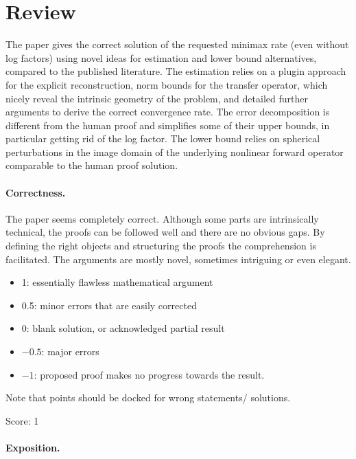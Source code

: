 \documentclass[11pt]{article}
\numberwithin{equation}{section}
\begin{document}
\maketitle

\section{Review}

The paper gives the correct solution of the requested minimax rate (even without log factors) using novel ideas for estimation and lower bound alternatives, compared to the published literature. The estimation relies on a plugin approach for the explicit reconstruction,  norm bounds for the transfer operator, which nicely reveal the intrinsic geometry of the problem, and detailed further arguments to derive the correct convergence rate. The error decomposition is different from the human proof and simplifies some of their upper bounds, in particular getting rid of the log factor. The lower bound relies on spherical perturbations in the image domain of the underlying nonlinear forward operator comparable to the human proof solution. 

\paragraph{Correctness.}

The paper seems completely correct. Although some parts are intrinsically technical, the proofs can be followed well and there are no obvious gaps. By defining the right objects and structuring the proofs the comprehension is facilitated. The arguments are mostly novel, sometimes intriguing or even elegant. 

\begin{itemize}
	\item  1: essentially flawless mathematical argument
	\item  0.5: minor errors that are easily corrected
	\item  0: blank solution, or acknowledged partial result
	\item  $-0.5$: major errors
	\item  $-1$: proposed proof makes no progress towards the result.
\end{itemize}
Note that points should be docked for wrong statements/ solutions.

\noindent Score: 1

\paragraph{Exposition.}
\end{document}
